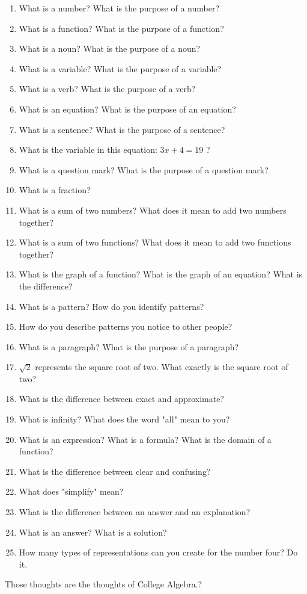 \documentclass{ximera}
\begin{document}
\begin{enumerate}
\item What is a number? What is the purpose of a number?
\item What is a function? What is the purpose of a function?
\item What is a noun? What is the purpose of a noun?
\item What is a variable? What is the purpose of a variable?
\item What is a verb? What is the purpose of a verb?
\item What is an equation? What is the purpose of an equation?
\item What is a sentence? What is the purpose of a sentence?
\item What is the variable in this equation:  $3x+4=19$ ? 
\item What is a question mark? What is the purpose of a question mark?
\item What is a fraction?
\item What is a sum of two numbers? What does it mean to add two numbers together? 
\item What is a sum of two functions? What does it mean to add two functions together?
\item What is the graph of a function? What is the graph of an equation? What is the difference?
\item What is a pattern? How do you identify patterns?
\item How do you describe patterns you notice to other people?
\item What is a paragraph? What is the purpose of a paragraph?
\item $\sqrt{2}$ represents the square root of two. What exactly is the square root of two?
\item What is the difference between exact and approximate?
\item What is infinity? What does the word "all" mean to you?
\item What is an expression?  What is a formula? What is the domain of a function?
\item What is the difference between clear and confusing? 
\item What does "simplify" mean?
\item What is the difference between an answer and an explanation? 
\item What is an answer? What is a solution?
\item How many types of representations can you create for the number four? Do it.
\end{enumerate}



Those thoughts are the thoughts of College Algebra.?
\end{document}
